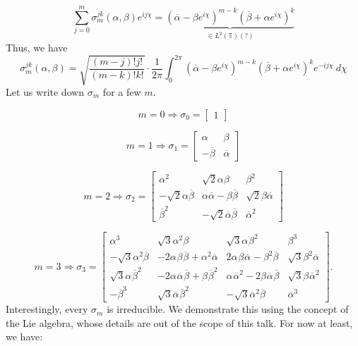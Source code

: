 \documentclass{article}
\begin{document}
\begin{equation}
    \sum_{j=0}^{m} \sigma^{jk}_{m}(\alpha,\beta)e^{ij\chi} 
    =
    \underbrace{
    (\overline{\alpha}- \beta e^{i\chi})^{m-k}(\overline{\beta}+\alpha e^{i\chi})^{k}}_{ \in L^{2}(\mathbb{T})(?)}
\end{equation}
Thus, we have
\begin{equation}
    \sigma^{jk}_{m}(\alpha,\beta) = 
    \sqrt{\frac{(m-j)!j!}{(m-k)!k!}}\cdot \frac{1}{2\pi} \int^{2\pi}_{0} (\overline{\alpha}- \beta e^{i\chi})^{m-k}(\overline{\beta}+\alpha e^{i\chi})^{k} e^{-ij\chi} \ d\chi
\end{equation}
Let us write down $\sigma_m$ for a few $m$.

\[ m = 0 \Rightarrow \sigma_0 = \left[\begin{matrix}1\end{matrix}\right] \] 

\[ m = 1 \Rightarrow \sigma_1 = 
\left[\begin{matrix} \alpha^{} &  \beta^{}\\-  \overline{\beta}^{} &  \overline{\alpha}^{}\end{matrix}\right]
\]%

\[%
    m=2 \Rightarrow \sigma_2 = 
    \left[\begin{matrix}\alpha^{2} &  \sqrt{2} \alpha \beta &  \beta^{2}\\- \sqrt{2} \alpha
    \overline{\beta} & \alpha \overline{\alpha} - \beta \overline{\beta} &  \sqrt{2} \beta
    \overline{\alpha}\\\overline{\beta}^{2} & - \sqrt{2} \overline{\alpha} \overline{\beta}
    & \overline{\alpha}^{2}\end{matrix}\right]
\]%

\[%
    m=3 \Rightarrow \sigma_3 =
    \left[\begin{matrix} \alpha^{3} & \sqrt{3} \alpha^{2} \beta^{} & \sqrt{3} \alpha^{}
    \beta^{2} &  \beta^{3}\\- \sqrt{3} \alpha^{2} \overline{\beta}^{} & - 2 \alpha^{} \beta^{}
    \overline{\beta}^{} +  \alpha^{2} \overline{\alpha}^{} & 2 \alpha^{} \beta^{} \overline{\alpha}^{}
    -  \beta^{2} \overline{\beta}^{} & \sqrt{3} \beta^{2} \overline{\alpha}^{}\\\sqrt{3}
    \alpha^{} \overline{\beta}^{2} & - 2 \alpha^{} \overline{\alpha}^{} \overline{\beta}^{}
    +  \beta^{} \overline{\beta}^{2} &  \alpha^{} \overline{\alpha}^{2} - 2 \beta^{} \overline{\alpha}^{}
    \overline{\beta}^{} & \sqrt{3} \beta^{} \overline{\alpha}^{2}\\-  \overline{\beta}^{3}
    & \sqrt{3} \overline{\alpha}^{} \overline{\beta}^{2} & - \sqrt{3} \overline{\alpha}^{2}
    \overline{\beta}^{} &  \overline{\alpha}^{3}\end{matrix}\right].
\]%
Interestingly, every $\sigma_m$ is irreducible. We demonstrate this using the concept of the Lie algebra, whose details are out of the scope of this talk. For now at least, we have:
\end{document}
